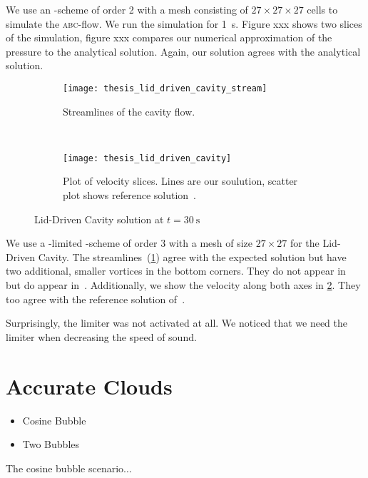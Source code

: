 We use an \aderdg{}-scheme of order 2 with a mesh consisting of $27 \times 27 \times 27$ cells to simulate the \textsc{abc}-flow.
We run the simulation for \SI{1}{\s}.
Figure xxx shows two slices of the simulation, figure xxx compares our numerical approximation of the pressure to the analytical solution.
Again, our solution agrees with the analytical solution.

\begin{figure}[htb]
  \centering
  \begin{subfigure}[t]{0.4\textwidth}
    \centering
    \texttt{[image: thesis\_lid\_driven\_cavity\_stream]}
    \caption{\label{fig:lid-driven-cavity-streamlines}%
      Streamlines of the cavity flow.}
  \end{subfigure}~%
  \begin{subfigure}[t]{0.7\textwidth}
    \centering
    \texttt{[image: thesis\_lid\_driven\_cavity]}
    \caption{\label{fig:lid-driven-cavity-result}%
      Plot of velocity slices. Lines are our soulution, scatter plot shows reference solution~\cite{ghia1982high}.}
  \end{subfigure}
  
  \caption{Lid-Driven Cavity solution at $t=\SI{30}{\s}$}
  \label{fig:lid-driven-cavity}
\end{figure}

We use a \muscl{}-limited \aderdg{}-scheme of order 3 with a mesh of size $27 \times 27$ for the Lid-Driven Cavity.
The streamlines~(\cref{fig:lid-driven-cavity-streamlines}) agree with the expected solution but have two additional, smaller vortices in the bottom corners.
They do not appear in~\cite{dumbser2010arbitrary} but do appear in~\cite{ghia1982high}.
Additionally, we show the velocity along both axes in \cref{fig:lid-driven-cavity-result}.
They too agree with the reference solution of~\cite{ghia1982high}.

Surprisingly, the limiter was not activated at all.
We noticed that we need the limiter when decreasing the speed of sound. 

\section{Accurate Clouds}
\begin{itemize}
\item Cosine Bubble
\item Two Bubbles
\end{itemize}
The cosine bubble scenario$\ldots$

